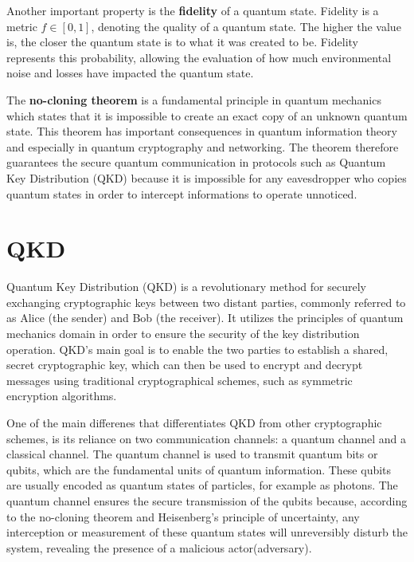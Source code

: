 		Another important property is the \textbf{fidelity} of a quantum state.
		Fidelity is a metric  \( \textit{f} \in [0,1] \), denoting the quality of a quantum state.
		The higher the value is, the closer the quantum state is to what it was created to be.
		Fidelity represents this probability, allowing the evaluation of how much environmental noise
		and losses have impacted the quantum state.

		The \textbf{no-cloning theorem} is a fundamental principle in quantum mechanics 
		which states that it is impossible to create an exact copy of an unknown quantum state. 
		This theorem has important consequences in quantum information theory and especially in
		quantum cryptography and networking. The theorem therefore guarantees the secure quantum communication 
		in protocols such as Quantum Key Distribution (QKD) because it is impossible for any eavesdropper who copies
		quantum states in order to intercept informations to operate unnoticed.

		\section{QKD}


		Quantum Key Distribution (QKD) is a revolutionary method for securely exchanging cryptographic keys between two distant parties\cite{powergrid}, 
		commonly referred to as Alice (the sender) and Bob (the receiver). 
		It utilizes the principles of quantum mechanics domain in order to ensure the security of the key distribution operation. 
		QKD's main goal is to enable the two parties to establish a shared, secret cryptographic key, 
		which can then be used to encrypt and decrypt messages using traditional cryptographical schemes, such as symmetric encryption algorithms.

		One of the main differenes that differentiates QKD from other cryptographic schemes, 
		is its reliance on two communication channels: 
		a quantum channel and a classical channel. 
		The quantum channel is used to transmit quantum bits or qubits, 
		which are the fundamental units of quantum information. 
		These qubits are usually encoded as quantum states of particles, for example as photons. 
		The quantum channel ensures the secure transmission of the qubits because, 
		according to the no-cloning theorem and 
		Heisenberg's principle of uncertainty, 
		any interception or measurement of these quantum states 
		will unreversibly disturb the system, revealing the presence of a malicious actor(adversary).

